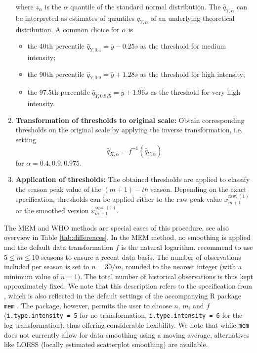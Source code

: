 \documentclass{article}
\newcommand{\sd}{s}
\begin{document}
\begin{enumerate}
where $z_\alpha$ is the $\alpha$ quantile of the standard normal distribution. The $\hat{q}_{Y, \alpha}$ can be interpreted as estimates of quantiles $q_{Y, \alpha}$ of an underlying theoretical distribution. A common choice for $\alpha$ is
\begin{itemize}
\item the 40th percentile $\hat{q}_{Y, 0.4} = \bar{y} - 0.25 \sd$ as the threshold for medium intensity;
\item the 90th percentile $\hat{q}_{Y, 0.9} = \bar{y} + 1.28 \sd$ as the threshold for high intensity;
\item the 97.5th percentile $\hat{q}_{Y, 0.975} = \bar{y} + 1.96\sd$ as the threshold for very high intensity.
\end{itemize}
\item \textbf{Transformation of thresholds to original scale:} Obtain corresponding thresholds on the original scale by applying the inverse transformation, i.e. setting %
$$
\hat{q}_{X, \alpha} = f^{-1}(\hat{q}_{Y, \alpha})
$$
for $\alpha = 0.4, 0.9, 0.975$.
\item \textbf{Application of thresholds:} The obtained thresholds are applied to classify the season peak value of the $(m + 1)-th$ season. Depending on the exact specification, thresholds can be applied either to the raw peak value $x_{m + 1}^{\text{raw}, (1)}$ or the smoothed version $x_{m + 1}^{\text{smo}, (1)}$.
\end{enumerate}

\noindent The MEM and WHO methods are special cases of this procedure, see also overview in Table \ref{tab:differences}. In the MEM method, no smoothing is applied and the default data transformation $f$ is the natural logarithm.  \cite{Vega2015} recommend to use $5 \leq m \leq 10$ seasons to ensure a recent data basis. The number of observations included per season is set to $n = 30/m$, rounded to the nearest integer (with a minimum value of $n = 1$). The total number of historical observations is thus kept approximately fixed. We note that this description refers to the specification from \cite{Vega2015}, which is also reflected in the default settings of the accompanying R package \texttt{mem} \citep{Lozano2020}. The package, however, permits the user to choose $n$, $m$, and $f$ (\texttt{i.type.intensity	= 5} for no transformation, \texttt{i.type.intensity = 6} for the log transformation), thus offering considerable flexibility. We note that while \texttt{mem} does not currently allow for data smoothing using a moving average, alternatives like LOESS (locally estimated scatterplot smoothing) are available. %
\end{document}
